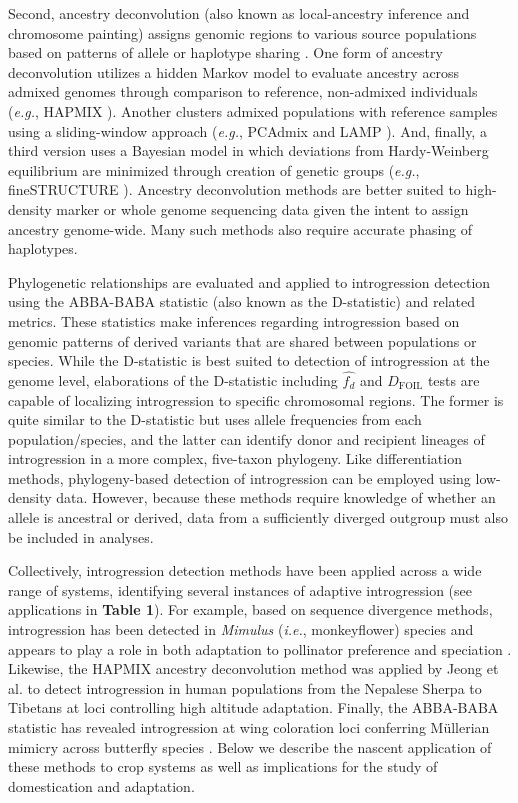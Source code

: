 \documentclass[11pt]{article}
\begin{document}
Second, ancestry deconvolution (also known as local-ancestry inference and chromosome painting) assigns genomic regions to various source populations based on patterns of allele or haplotype sharing \cite{schraiber2015}. 
One form of ancestry deconvolution utilizes a hidden Markov model to evaluate ancestry across admixed genomes through comparison to reference, non-admixed individuals (\emph{e.g.}, HAPMIX \cite{Price2009}). 
Another clusters admixed populations with reference samples using a sliding-window approach (\emph{e.g.}, PCAdmix \cite{brisbin2012pcadmix} and LAMP \cite{sankararaman2008}).
And, finally, a third version uses a Bayesian model \cite{pritchard2000} in which deviations from Hardy-Weinberg equilibrium are minimized through creation of genetic groups (\emph{e.g.}, fineSTRUCTURE \cite{Lawson2012}).
Ancestry deconvolution methods are better suited to high-density marker or whole genome sequencing data given the intent to assign ancestry genome-wide.
Many such methods also require accurate phasing of haplotypes.

Phylogenetic relationships are evaluated and applied to introgression detection using the ABBA-BABA statistic (also known as the D-statistic) and related metrics.
These statistics make inferences regarding introgression based on genomic patterns of derived variants that are shared between populations or species.
While the D-statistic is best suited to detection of introgression at the genome level, elaborations of the D-statistic including $\hat{f_{d}}$ \cite{martin2015} and $D_{\textrm{FOIL}}$ tests \cite{pease2015} are capable of localizing introgression to specific chromosomal regions. 
The former is quite similar to the D-statistic but uses allele frequencies from each population/species, and the latter can identify donor and recipient lineages of introgression in a more complex, five-taxon phylogeny.
Like differentiation methods, phylogeny-based detection of introgression can be employed using low-density data.
However, because these methods require knowledge of whether an allele is ancestral or derived, data from a sufficiently diverged outgroup must also be included in analyses.

Collectively, introgression detection methods have been applied across a wide range of systems, identifying several instances of adaptive introgression (see applications in \textbf{Table 1}).
For example, based on sequence divergence methods, introgression has been detected in \emph{Mimulus} (\emph{i.e.}, monkeyflower) species and appears to play a role in both adaptation to pollinator preference and speciation \cite{Stankowski2015}.
Likewise, the HAPMIX ancestry deconvolution method was applied by Jeong et al. \cite{jeong2014} to detect introgression in human populations from the Nepalese Sherpa to Tibetans at loci controlling high altitude adaptation.
Finally, the ABBA-BABA statistic has revealed introgression at wing coloration loci conferring M\"{u}llerian mimicry across butterfly species \cite{heliconius2012}.
Below we describe the nascent application of these methods to crop systems as well as implications for the study of domestication and adaptation.
\end{document}
